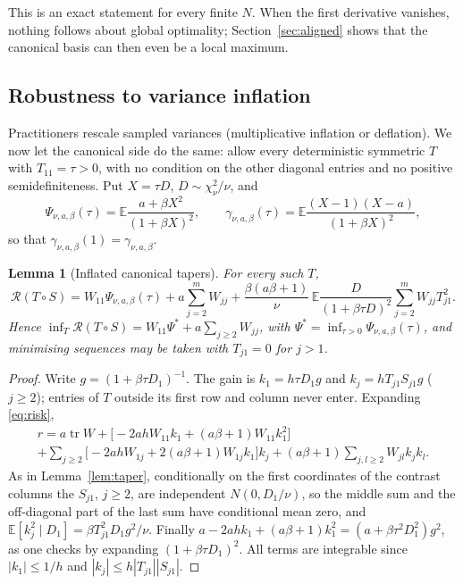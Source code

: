 \documentclass[11pt,a4paper]{article}
\numberwithin{equation}{section}
\newtheorem{lemma}[theorem]{Lemma}
\theoremstyle{remark}\newtheorem{remark}[theorem]{Remark}
\newcommand{\E}{\mathbb E}
\newcommand{\tr}{\operatorname{tr}}
\newcommand{\risk}{\mathcal R}
\begin{document}
This is an exact statement for every finite \(N\). When the first derivative vanishes, nothing
follows about global optimality; Section~\ref{sec:aligned} shows that the canonical basis can
then even be a local maximum.

\subsection{Robustness to variance inflation}\label{sec:inflation}

Practitioners rescale sampled variances (multiplicative inflation or deflation). We now let
the canonical side do the same: allow every deterministic symmetric \(T\) with
\(T_{11}=\tau>0\), with no condition on the other diagonal entries and no positive
semidefiniteness. Put \(X=\tau D\), \(D\sim\chi^2_\nu/\nu\), and
\[
 \Psi_{\nu,a,\beta}(\tau)=\E\frac{a+\beta X^2}{(1+\beta X)^2},\qquad
 \gamma_{\nu,a,\beta}(\tau)=\E\frac{(X-1)(X-a)}{(1+\beta X)^2},
\]
so that \(\gamma_{\nu,a,\beta}(1)=\gamma_{\nu,a,\beta}\).

\begin{lemma}[Inflated canonical tapers]\label{lem:inflated}
For every such \(T\),
\begin{equation}\label{eq:inflated}
 \risk(T\circ S)=W_{11}\Psi_{\nu,a,\beta}(\tau)+a\sum_{j=2}^mW_{jj}
 +\frac{\beta(a\beta+1)}{\nu}\,\E\frac{D}{(1+\beta\tau D)^2}\sum_{j=2}^mW_{jj}T_{j1}^2 .
\end{equation}
Hence \(\inf_T\risk(T\circ S)=W_{11}\Psi^*+a\sum_{j\ge2}W_{jj}\), with
\(\Psi^*=\inf_{\tau>0}\Psi_{\nu,a,\beta}(\tau)\), and minimising sequences may be taken with
\(T_{j1}=0\) for \(j>1\).
\end{lemma}
\begin{proof}
Write \(g=(1+\beta\tau D_1)^{-1}\). The gain is \(k_1=h\tau D_1g\) and \(k_j=hT_{j1}S_{j1}g\)
(\(j\ge2\)); entries of \(T\) outside its first row and column never enter. Expanding
\eqref{eq:risk},
\begin{multline*}
 r=a\tr W+\bigl[-2ahW_{11}k_1+(a\beta+1)W_{11}k_1^2\bigr]\\
 +\sum_{j\ge2}\bigl[-2ahW_{1j}+2(a\beta+1)W_{1j}k_1\bigr]k_j
 +(a\beta+1)\sum_{j,l\ge2}W_{jl}k_jk_l.
\end{multline*}
As in Lemma~\ref{lem:taper}, conditionally on the first coordinates of the contrast columns the
\(S_{j1}\), \(j\ge2\), are independent \(N(0,D_1/\nu)\), so the middle sum and the off-diagonal part
of the last sum have conditional mean zero, and \(\E[k_j^2\mid D_1]=\beta T_{j1}^2D_1g^2/\nu\).
Finally \(a-2ahk_1+(a\beta+1)k_1^2=(a+\beta\tau^2D_1^2)g^2\), as one checks by expanding
\((1+\beta\tau D_1)^2\). All terms are integrable since \(|k_1|\le1/h\) and
\(|k_j|\le h|T_{j1}||S_{j1}|\).
\end{proof}
\end{document}

